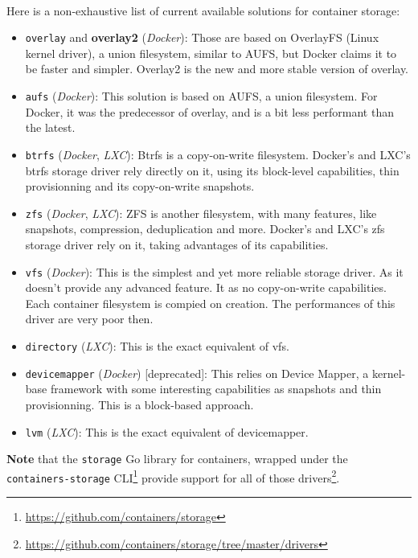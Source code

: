 \paragraph{}Here is a non-exhaustive list of current available solutions for container storage:
\begin{itemize}
\renewcommand\labelitemi{--}
  \item \texttt{overlay} and \textbf{overlay2} (\textit{Docker}): Those are based on OverlayFS (Linux kernel driver), a union filesystem, similar to AUFS, but Docker claims it to be faster and simpler.  Overlay2 is the new and more stable version of overlay.
  \item \texttt{aufs} (\textit{Docker}): This solution is based on AUFS, a union filesystem.  For Docker, it was the predecessor of overlay, and is a bit less performant than the latest.
  \item \texttt{btrfs} (\textit{Docker}, \textit{LXC}):  Btrfs is a copy-on-write filesystem.  Docker's and LXC's btrfs storage driver rely directly on it, using its block-level capabilities, thin provisionning and its copy-on-write snapshots.
  \item \texttt{zfs} (\textit{Docker}, \textit{LXC}): ZFS is another filesystem, with many features, like snapshots, compression, deduplication and more.  Docker's and LXC's zfs storage driver rely on it, taking advantages of its capabilities.
  \item \texttt{vfs} (\textit{Docker}):  This is the simplest and yet more reliable storage driver.  As it doesn't provide any advanced feature.  It as no copy-on-write capabilities.  Each container filesystem is compied on creation.  The performances of this driver are very poor then.
  \item \texttt{directory} (\textit{LXC}):  This is the exact equivalent of vfs.
  \item \texttt{devicemapper} (\textit{Docker}) [deprecated]:  This relies on Device Mapper, a kernel-base framework with some interesting capabilities as snapshots and thin provisionning.  This is a block-based approach.
  \item \texttt{lvm} (\textit{LXC}):  This is the exact equivalent of devicemapper.
\end{itemize}

\textbf{Note} that the \texttt{storage} Go library for containers, wrapped under the \texttt{containers-storage} CLI\footnote{\href{https://github.com/containers/storage}{https://github.com/containers/storage}} provide support for all of those drivers\footnote{\href{https://github.com/containers/storage/tree/master/drivers}{https://github.com/containers/storage/tree/master/drivers}}.

